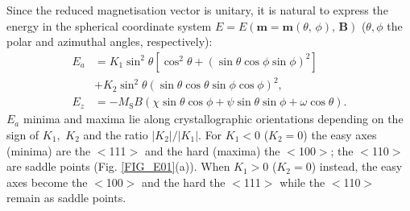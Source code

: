 Since the reduced magnetisation vector is unitary, it is natural to express the energy in the spherical coordinate system $E=E(\boldsymbol{m}=\boldsymbol{m}(\theta,\,\phi),\, \boldsymbol{B})$ ($\theta, \phi$ the polar and azimuthal angles, respectively):
\begin{align}
E_a &= K_1 \sin^2\theta\left[ \cos^2\theta + \left( \sin\theta\cos\phi\sin\phi\right)^2 \right] \nonumber \\
    &+ K_2\sin^2\theta \left( \sin\theta\cos\theta\sin\phi\cos\phi \right)^2, \label{EQ:ENERGY anis} \\
E_z &= -M_\text{S}B \left( \chi\sin\theta\cos\phi + \psi\sin\theta\sin\phi + \omega\cos\theta\right). \label{EQ:ENERGY ext}
\end{align}
$E_a$ minima and maxima lie along crystallographic orientations depending on the sign of $K_1,\,\,K_2$ and the ratio $|K_2| / |K_1|$. For $K_1<0$ ($K_2=0$) the easy axes (minima) are the $<$111$>$ and the hard (maxima) the $<$100$>$; the $<$110$>$ are saddle points (Fig. \ref{FIG_E01}(a)). When $K_1>0$ ($K_2=0$) instead, the easy axes become the $<$100$>$ and the hard the $<$111$>$ while the $<$110$>$ remain as saddle points.\par

